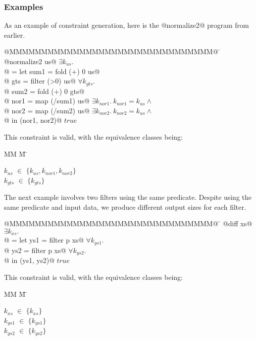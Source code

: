 \subsubsection{Examples}
As an example of constraint generation, here is the @normalize2@ program from earlier.
\begin{tabbing}
@MMMMMMMMMMMMMMMMMMMMMMMMMMMMMMMM@  \= \kill
@normalize2 us@                     \> $\exists k_{us}.$      \\
@ = let sum1 = fold   (+) 0 us@     \>                      \\
@       gts  = filter (>0)  us@     \> $\forall k_{gts}.$ \\
@       sum2 = fold   (+) 0 gts@    \> \\
@       nor1 = map  (/sum1) us@     \> $\exists k_{nor1}.\ k_{nor1} = k_{us} \wedge$ \\
@       nor2 = map  (/sum2) us@     \> $\exists k_{nor2}.\ k_{nor2} = k_{us} \wedge$ \\
@   in (nor1, nor2)@                \> $true$ \\
\end{tabbing}
This constraint is valid, with the equivalence classes being:
\newcommand{\eqclasses}[1]{
    \begin{tabbing}
        MM \= M \= \kill
        #1
    \end{tabbing}}
\newcommand{\eqclass}[2]{$#1$ \> $\in$ \> $\{#2\}$ \\}
\eqclasses{
    \eqclass{k_{us}}{k_{us}, k_{nor1}, k_{nor2}}
    \eqclass{k_{gts}}{k_{gts}}
}

The next example involves two filters using the same predicate.
Despite using the same predicate and input data, we produce different output sizes for each filter.
\begin{tabbing}
@MMMMMMMMMMMMMMMMMMMMMMMMMMMMMMMM@  \= \kill
@diff xs@                           \> $\exists k_{xs}.$ \\
@ = let ys1 = filter p xs@          \> $\forall k_{ys1}.$       \\
@       ys2 = filter p xs@          \> $\forall k_{ys2}.$       \\
@   in (ys1, ys2)@                  \> $true$                   \\
\end{tabbing}

This constraint is valid, with the equivalence classes being:
\eqclasses{
    \eqclass{k_{xs}}    {k_{xs}}
    \eqclass{k_{ys1}}   {k_{ys1}}
    \eqclass{k_{ys2}}   {k_{ys2}}
}

